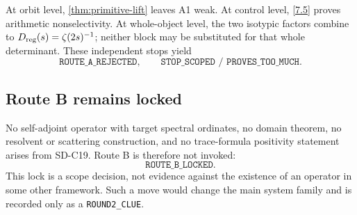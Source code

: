 At orbit level, \cref{thm:primitive-lift} leaves A1 weak.  At control level,
\eqref{7.5} proves arithmetic nonselectivity.  At whole-object level, the two
isotypic factors combine to
\(D_{\mathrm{reg}}(s)=\zeta(2s)^{-1}\); neither block may be substituted for that whole
determinant.  These independent stops yield
\[
\texttt{ROUTE\_A\_REJECTED},\qquad
\texttt{STOP\_SCOPED / PROVES\_TOO\_MUCH}.
\tag{8.5}\label{8.5}
\]

\subsection{Route B remains locked}

No self-adjoint operator with target spectral ordinates, no domain theorem,
no resolvent or scattering construction, and no trace-formula positivity
statement arises from SD-C19.  Route B is therefore not invoked:
\[
\texttt{ROUTE\_B\_LOCKED}.
\tag{8.6}\label{8.6}
\]
This lock is a scope decision, not evidence against the existence of an
operator in some other framework.  Such a move would change the main system
family and is recorded only as a \texttt{ROUND2\_CLUE}.
